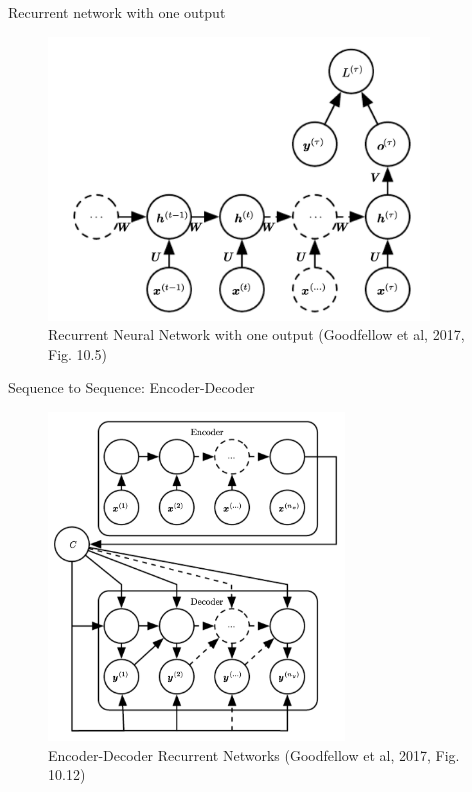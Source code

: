 \documentclass[10pt]{beamer}
\begin{document}
\begin{frame}{Recurrent network with one output}

\begin{figure}[h]
\centering
\includegraphics[width=0.9\textwidth]{fig/DL_10_5_RNN_one_class.png}
\caption{Recurrent Neural Network with one output (Goodfellow et al, 2017, Fig. 10.5)}
\end{figure}

\end{frame}

\begin{frame}{Sequence to Sequence: Encoder-Decoder}

\begin{figure}[h]
\centering
\includegraphics[width=0.7\textwidth]{fig/DL_10_12_Encoder_Decoder.png}
\caption{Encoder-Decoder Recurrent Networks (Goodfellow et al, 2017, Fig. 10.12)}
\end{figure}

\end{frame}
\end{document}
